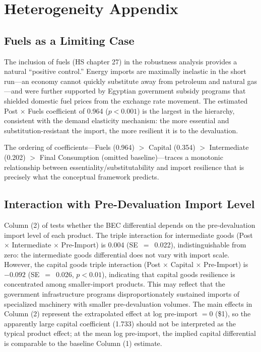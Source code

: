 \documentclass[12pt]{article}
\begin{document}
\section{Heterogeneity Appendix}
\label{sec:het_appendix}

\subsection{Fuels as a Limiting Case}

The inclusion of fuels (HS chapter 27) in the robustness analysis provides a natural ``positive control.'' Energy imports are maximally inelastic in the short run---an economy cannot quickly substitute away from petroleum and natural gas---and were further supported by Egyptian government subsidy programs that shielded domestic fuel prices from the exchange rate movement. The estimated Post $\times$ Fuels coefficient of 0.964 ($p < 0.001$) is the largest in the hierarchy, consistent with the demand elasticity mechanism: the more essential and substitution-resistant the import, the more resilient it is to the devaluation.

The ordering of coefficients---Fuels (0.964) $>$ Capital (0.354) $>$ Intermediate (0.202) $>$ Final Consumption (omitted baseline)---traces a monotonic relationship between essentiality/substitutability and import resilience that is precisely what the conceptual framework predicts.

\subsection{Interaction with Pre-Devaluation Import Level}

Column (2) of  tests whether the BEC differential depends on the pre-devaluation import level of each product. The triple interaction for intermediate goods (Post $\times$ Intermediate $\times$ Pre-Import) is 0.004 (SE~$=$~0.022), indistinguishable from zero: the intermediate goods differential does not vary with import scale. However, the capital goods triple interaction (Post $\times$ Capital $\times$ Pre-Import) is $-0.092$ (SE~$=$~0.026, $p < 0.01$), indicating that capital goods resilience is concentrated among smaller-import products. This may reflect that the government infrastructure programs disproportionately sustained imports of specialized machinery with smaller pre-devaluation volumes. The main effects in Column (2) represent the extrapolated effect at log pre-import $= 0$ (\$1), so the apparently large capital coefficient (1.733) should not be interpreted as the typical product effect; at the mean log pre-import, the implied capital differential is comparable to the baseline Column (1) estimate.
\end{document}
